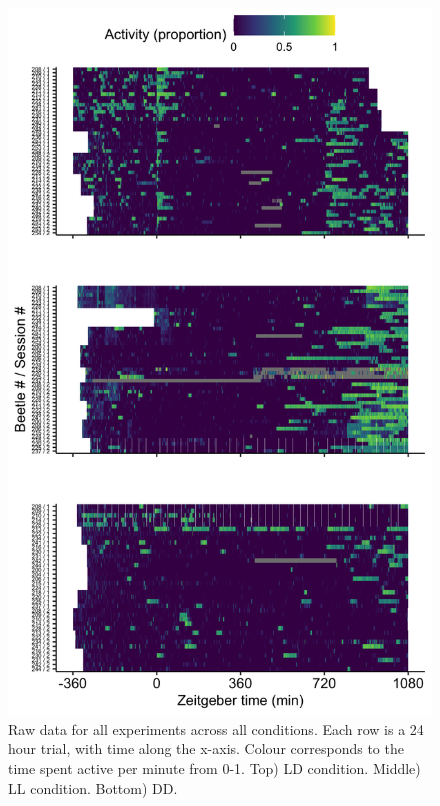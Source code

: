\begin{figure}
    \begin{fullwidth}
        \centering
        \includegraphics[width = 0.9\hsize]{src/figures/all-individual-activity.png}
        \caption{Raw data for all experiments across all conditions. Each row is a 24 hour trial, with time along the x-axis. Colour corresponds to the time spent active per minute from 0-1. Top) LD condition. Middle) LL condition. Bottom) DD.}
        \label{fig:activity-all-individual}
    \end{fullwidth}
\end{figure}


